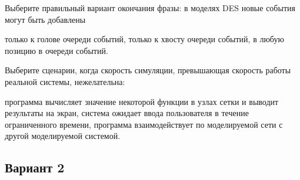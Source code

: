 \begin{questions}
\question[3] Выберите правильный вариант окончания фразы: в моделях DES новые события могут быть добавлены
\begin{choices}
    \choice только к голове очереди событий,
    \choice только к хвосту очереди событий,
    \correctchoice в любую позицию в очереди событий.
\end{choices}
    
\question[3] Выберите сценарии, когда скорость симуляции, превышающая скорость работы реальной системы, нежелательна:
\begin{choices}
    \choice программа вычисляет значение некоторой функции в узлах сетки и выводит результаты на экран,
    \correctchoice система ожидает ввода пользователя в течение ограниченного времени,
    \choice программа взаимодействует по моделируемой сети с другой моделируемой системой.
\end{choices}


\end{questions}

\subsection*{Вариант 2}

